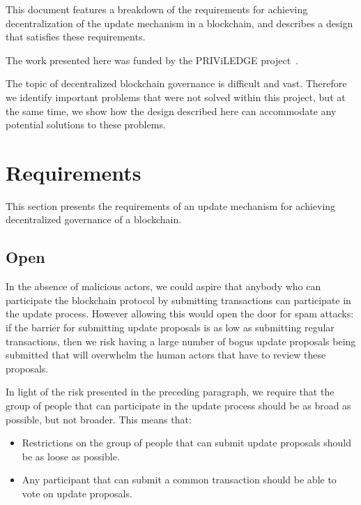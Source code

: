 \documentclass[11pt,a4paper]{article}
\begin{document}
This document features a breakdown of the requirements for achieving
decentralization of the update mechanism in a blockchain, and describes a design
that satisfies these requirements.

The work presented here was funded by the PRIViLEDGE project~\cite{priviledge}.

The topic of decentralized blockchain governance is difficult and vast.
%
Therefore we identify important problems that were not solved within this
project, but at the same time, we show how the design described here can
accommodate any potential solutions to these problems.


\section{Requirements}
\label{sec:requirements}

This section presents the requirements of an update mechanism for achieving
decentralized governance of a blockchain.

\subsection{Open}
\label{sec:open-participation}

In the absence of malicious actors, we could aspire that anybody who can
participate the blockchain protocol by submitting transactions can participate
in the update process. However allowing this would open the door for spam
attacks: if the barrier for submitting update proposals is as low as submitting
regular transactions, then we risk having a large number of bogus update
proposals being submitted that will overwhelm the human actors that have to
review these proposals.

In light of the risk presented in the preceding paragraph, we require that the
group of people that can participate in the update process should be as broad as
possible, but not broader. This means that:
\begin{itemize}
\item Restrictions on the group of people that can submit update proposals
  should be as loose as possible.
\item Any participant that can submit a common transaction should be able to
  vote on update proposals.
\end{itemize}
\end{document}
